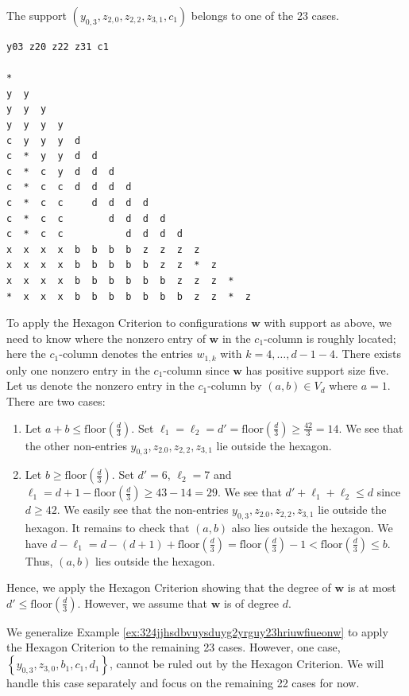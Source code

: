\begin{example}\label{ex:324jjhsdbvuysduyg2yrguy23hriuwfiueonw}
    The support \( ( y_{0,3}, z_{2,0}, z_{2,2}, z_{3,1}, c_1) \) belongs to one of the 23 cases. 
\begin{verbatim}
y03 z20 z22 z31 c1

*  
y  y  
y  y  y  
y  y  y  y  
c  y  y  y  d  
c  *  y  y  d  d  
c  *  c  y  d  d  d  
c  *  c  c  d  d  d  d  
c  *  c  c     d  d  d  d  
c  *  c  c        d  d  d  d  
c  *  c  c           d  d  d  d  
x  x  x  x  b  b  b  b  z  z  z  z  
x  x  x  x  b  b  b  b  b  z  z  *  z  
x  x  x  x  b  b  b  b  b  b  z  z  z  *  
*  x  x  x  b  b  b  b  b  b  b  z  z  *  z  
\end{verbatim}
To apply the Hexagon Criterion to configurations \( \mathbf{w} \) with support as above, we need to know where the nonzero entry of \( \mathbf{w} \) in the \( c_1 \)-column is roughly located; here the \( c_1 \)-column denotes the entries \( w_{1,k} \) with \( k = 4, \dots, d - 1 - 4 \). There exists only one nonzero entry in the \( c_1 \)-column since \( \mathbf{w} \) has positive support size five. Let us denote the nonzero entry in the \( c_1 \)-column by \( (a,b) \in V_d \) where \( a = 1 \). There are two cases:
\begin{enumerate}
    \item Let \( a + b \leq \mathrm{floor}(\frac{d}{3})\). Set \( \ell_1 = \ell_2 = d' =  \mathrm{floor}(\frac{d}{3}) \geq \frac{42}{3} = 14 \). We see that the other non-entries \( y_{0,3}, z_{2.0}, z_{2,2}, z_{3,1} \) lie outside the hexagon.
    \item Let \( b \geq \mathrm{floor}(\frac{d}{3})  \). Set \( d' = 6 \), \( \ell_2 = 7 \) and \( \ell_1 = d + 1 - \mathrm{floor}(\frac{d}{3}) \geq 43 - 14 = 29 \). We see that \( d' + \ell_1 + \ell_2 \leq d \) since \( d \geq 42 \). We easily see that the non-entries \( y_{0,3}, z_{2.0}, z_{2,2}, z_{3,1} \) lie outside the hexagon. It remains to check that \( (a,b) \) also lies outside the hexagon. We have \( d - \ell_1 = d - (d + 1) + \mathrm{floor}(\frac{d}{3}) =\mathrm{floor}(\frac{d}{3}) - 1 < \mathrm{floor}(\frac{d}{3}) \leq b \). Thus, \( (a,b) \) lies outside the hexagon.
\end{enumerate}
Hence, we apply the Hexagon Criterion showing that the degree of \( \mathbf{w} \) is at most \( d' \leq \mathrm{floor}(\frac{d}{3}) \). However, we assume that \( \mathbf{w} \) is of degree \( d \).
\end{example}

We generalize Example \ref{ex:324jjhsdbvuysduyg2yrguy23hriuwfiueonw} to apply the Hexagon Criterion to the remaining 23 cases. However, one case, \( \left\{ y_{0,3}, z_{3,0}, b_1, c_1, d_1 \right\} \), cannot be ruled out by the Hexagon Criterion. We will handle this case separately and focus on the remaining 22 cases for now.

